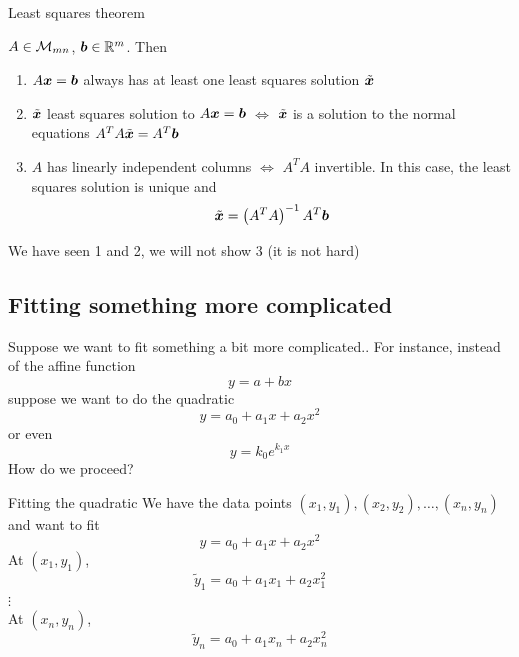 \documentclass[aspectratio=169]{beamer}\usepackage[]{graphicx}\usepackage[]{xcolor}
\begin{document}
\begin{frame}{Least squares theorem}
\begin{importanttheorem}\label{th:least_squares}
$A\in\mathcal{M}_{mn}$, $\bm{b}\in\mathbb{R}^m$. Then
\begin{enumerate}
\item $A\bm{x}=\bm{b}$ always has at least one least squares solution $\tilde{\bm{x}}$
\item $\tilde{\bm{x}}$ least squares solution to $A\bm{x}=\bm{b}$ $\iff$ $\tilde{\bm{x}}$ is a solution to the normal equations $A^TA\tilde{\bm{x}} = A^T\bm{b}$
\item $A$ has linearly independent columns $\iff$ $A^TA$ invertible.  
\newline In this case, the least squares solution is unique and 
\[
\tilde{\bm{x}} = \left(A^TA\right)^{-1}A^T\bm{b}
\]
\end{enumerate}
\end{importanttheorem}
\vfill
We have seen 1 and 2, we will not show 3 (it is not hard)
\end{frame}


\subsection{Fitting something more complicated}

\begin{frame}{Suppose we want to fit something a bit more complicated..}
For instance, instead of the affine function
\[
y = a+bx
\]
suppose we want to do the quadratic
\[
y = a_0+a_1x+a_2x^2
\]
or even
\[
y = k_0 e^{k_1x}
\]
\vfill
How do we proceed?
\end{frame}


\begin{frame}{Fitting the quadratic}
We have the data points $(x_1,y_1),(x_2,y_2),\ldots,(x_n,y_n)$ and want to fit
\[
y = a_0+a_1x+a_2x^2
\]
At $(x_1,y_1)$,
\[
\tilde y_1 = a_0+a_1x_1+a_2x_1^2
\]
$\vdots$\\
At $(x_n,y_n)$,
\[
\tilde y_n = a_0+a_1x_n+a_2x_n^2
\]
\end{frame}
\end{document}
